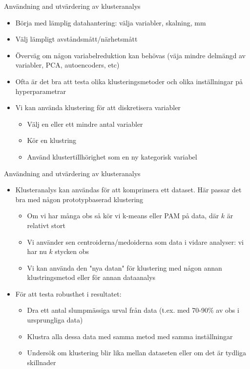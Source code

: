 \documentclass[10pt,english]{beamer}
\begin{document}
\begin{frame}{Användning and utvärdering av klusteranalys}

    \begin{itemize}
        \item Börja med lämplig datahantering: välja variabler, skalning, mm
        \item Välj lämpligt avståndsmått/närhetsmått
        \item Överväg om någon variabelreduktion kan behövas (väja mindre delmängd av variabler, PCA, autoencoders, etc)
        \item Ofta är det bra att testa olika klusteringsmetoder och olika inställningar på hyperparametrar
        \item Vi kan använda klustering för att diskretisera variabler
        \begin{itemize}
          \item Välj en eller ett mindre antal variabler
          \item Kör en klustring
          \item Använd klustertillhörighet som en ny kategorisk variabel
        \end{itemize}
    \end{itemize}
    
\end{frame}

\begin{frame}{Användning and utvärdering av klusteranalys}

    \begin{itemize}
        
        
        \item Klusteranalys kan användas för att komprimera ett dataset. Här passar det bra med någon prototypbaserad klustering
        \begin{itemize}
            \item Om vi har många obs så kör vi k-means eller PAM på data, där $k$ är relativt stort
            \item Vi använder sen centroiderna/medoiderna som data i vidare analyser: vi har nu $k$ stycken obs
            \item Vi kan använda den "nya datan" för klustering med någon annan klustringsmetod eller för annan dataanalys
        \end{itemize}
        
        
        \item För att testa robusthet i resultatet:
        \begin{itemize}
          \item Dra ett antal slumpmässiga urval från data (t.ex. med 70-90\% av obs i ursprungliga data) 
          \item Klustra alla dessa data med samma metod med samma inställningar
          \item Undersök om klustering blir lika mellan dataseten eller om det är tydliga skillnader
        \end{itemize}
    \end{itemize}
    
\end{frame}
\end{document}
